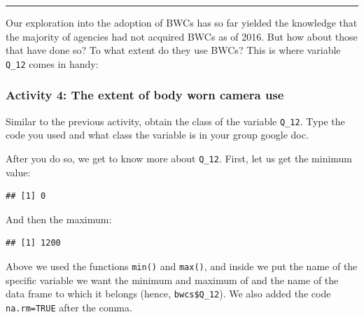 \documentclass[
]{book}
\newenvironment{Shaded}{\begin{snugshade}}{\end{snugshade}}
\newcommand{\AttributeTok}[1]{\textcolor[rgb]{0.77,0.63,0.00}{#1}}
\newcommand{\ConstantTok}[1]{\textcolor[rgb]{0.00,0.00,0.00}{#1}}
\newcommand{\FunctionTok}[1]{\textcolor[rgb]{0.00,0.00,0.00}{#1}}
\newcommand{\NormalTok}[1]{#1}
\newcommand{\SpecialCharTok}[1]{\textcolor[rgb]{0.00,0.00,0.00}{#1}}
\begin{document}
\begin{center}\rule{0.5\linewidth}{0.5pt}\end{center}

Our exploration into the adoption of BWCs has so far yielded the knowledge that the majority of agencies had not acquired BWCs as of 2016. But how about those that have done so? To what extent do they use BWCs? This is where variable \texttt{Q\_12} comes in handy:

\hypertarget{activity-4-the-extent-of-body-worn-camera-use}{%
\subsubsection{Activity 4: The extent of body worn camera use}\label{activity-4-the-extent-of-body-worn-camera-use}}

Similar to the previous activity, obtain the class of the variable \texttt{Q\_12}. Type the code you used and what class the variable is in your group google doc.

After you do so, we get to know more about \texttt{Q\_12}. First, let us get the minimum value:

\begin{Shaded}
\end{Shaded}

\begin{verbatim}
## [1] 0
\end{verbatim}

And then the maximum:

\begin{Shaded}
\end{Shaded}

\begin{verbatim}
## [1] 1200
\end{verbatim}

Above we used the functions \texttt{min()} and \texttt{max()}, and inside we put the name of the specific variable we want the minimum and maximum of and the name of the data frame to which it belongs (hence, \texttt{bwcs\$Q\_12}). We also added the code \texttt{na.rm=TRUE} after the comma.
\end{document}
